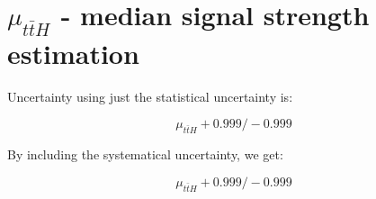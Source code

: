 \section{$\mu_{t\bar{t}H}$ - median signal strength estimation}

Uncertainty using just the statistical uncertainty is:

$$
    \mu_{t\bar{t}H} + 0.999 /-0.999
$$

By including the systematical uncertainty, we get:

$$
    \mu_{t\bar{t}H} + 0.999 /-0.999
$$

